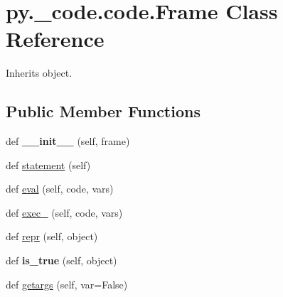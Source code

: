 \hypertarget{classpy_1_1__code_1_1code_1_1_frame}{}\section{py.\+\_\+code.\+code.\+Frame Class Reference}
\label{classpy_1_1__code_1_1code_1_1_frame}


Inherits object.

\subsection*{Public Member Functions}
\begin{DoxyCompactItemize}
\item 
\mbox{\label{classpy_1_1__code_1_1code_1_1_frame_ae40f65e128001557b7fdb81561b24e01}} 
def {\bfseries \+\_\+\+\_\+init\+\_\+\+\_\+} (self, frame)
\item 
def \hyperlink{classpy_1_1__code_1_1code_1_1_frame_a94ebaef23b91092b348a7bcf56098fe7}{statement} (self)
\item 
def \hyperlink{classpy_1_1__code_1_1code_1_1_frame_a150310a7a1ef54e1dccd9e4366ab02bf}{eval} (self, code, vars)
\item 
def \hyperlink{classpy_1_1__code_1_1code_1_1_frame_a39b450ad358b486d79e789ed9f40f0c5}{exec\+\_\+} (self, code, vars)
\item 
def \hyperlink{classpy_1_1__code_1_1code_1_1_frame_aa063a5e1033603b0c6e6b753884536bd}{repr} (self, object)
\item 
\mbox{\label{classpy_1_1__code_1_1code_1_1_frame_a9f442a9120f1374c3648196c6af34e7c}} 
def {\bfseries is\+\_\+true} (self, object)
\item 
def \hyperlink{classpy_1_1__code_1_1code_1_1_frame_a3d1533c08317c066291a7a7296675922}{getargs} (self, var=False)
\end{DoxyCompactItemize}
